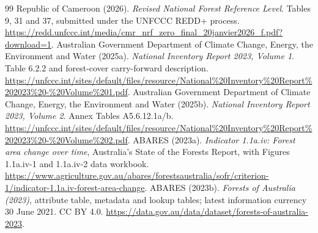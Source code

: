 \documentclass[11pt,a4paper]{article}
\begin{document}
\begin{thebibliography}{99}
 Republic of Cameroon (2026). \emph{Revised National Forest Reference Level}. Tables 9, 31 and 37, submitted under the UNFCCC REDD+ process. \url{https://redd.unfccc.int/media/cmr_nrf_zero_final_20janvier2026_f.pdf?download=1}.
 Australian Government Department of Climate Change, Energy, the Environment and Water (2025a). \emph{National Inventory Report 2023, Volume 1}. Table 6.2.2 and forest-cover carry-forward description. \url{https://unfccc.int/sites/default/files/resource/National%20Inventory%20Report%202023%20-%20Volume%201.pdf}.
 Australian Government Department of Climate Change, Energy, the Environment and Water (2025b). \emph{National Inventory Report 2023, Volume 2}. Annex Tables A5.6.12.1a/b. \url{https://unfccc.int/sites/default/files/resource/National%20Inventory%20Report%202023%20-%20Volume%202.pdf}.
 ABARES (2023a). \emph{Indicator 1.1a.iv: Forest area change over time}, Australia's State of the Forests Report, with Figures 1.1a.iv-1 and 1.1a.iv-2 data workbook. \url{https://www.agriculture.gov.au/abares/forestsaustralia/sofr/criterion-1/indicator-1.1a.iv-forest-area-change}.
 ABARES (2023b). \emph{Forests of Australia (2023)}, attribute table, metadata and lookup tables; latest information currency 30 June 2021. CC BY 4.0. \url{https://data.gov.au/data/dataset/forests-of-australia-2023}.

\end{thebibliography}
\end{document}
